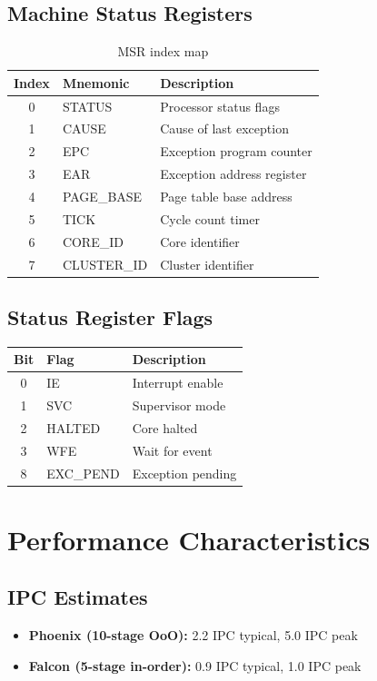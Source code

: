 \documentclass[11pt,a4paper]{article}
\begin{document}
\subsection{Machine Status Registers}
\begin{table}[htbp]
\centering
\caption{MSR index map}
\begin{tabular}{cll}
\toprule
Index & Mnemonic  & Description \\
\midrule
0     & STATUS    & Processor status flags \\
1     & CAUSE     & Cause of last exception \\
2     & EPC       & Exception program counter \\
3     & EAR       & Exception address register \\
4     & PAGE\_BASE & Page table base address \\
5     & TICK      & Cycle count timer \\
6     & CORE\_ID  & Core identifier \\
7     & CLUSTER\_ID & Cluster identifier \\
\bottomrule
\end{tabular}
\end{table}

\subsection{Status Register Flags}
\begin{table}[htbp]
\centering
\begin{tabular}{cll}
\toprule
Bit & Flag   & Description \\
\midrule
0   & IE     & Interrupt enable \\
1   & SVC    & Supervisor mode \\
2   & HALTED & Core halted \\
3   & WFE    & Wait for event \\
8   & EXC\_PEND & Exception pending \\
\bottomrule
\end{tabular}
\end{table}

\newpage

\section{Performance Characteristics}

\subsection{IPC Estimates}
\begin{itemize}[nosep]
  \item \textbf{Phoenix (10-stage OoO):} 2.2 IPC typical, 5.0 IPC peak
  \item \textbf{Falcon (5-stage in-order):} 0.9 IPC typical, 1.0 IPC peak
\end{itemize}
\end{document}
